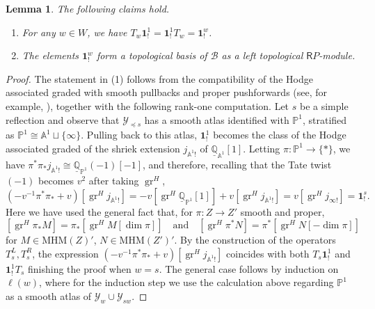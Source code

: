 \documentclass{amsart}
\newcommand{\Ring}{\mathsf{R}}
\newcommand{\bone}{\mathbf{1}}
\newcommand{\gr}{\operatorname{gr}}
\newcommand{\mhm}{\mathrm{MHM}}
\newcommand{\mc}[1]{\mathcal{#1}}
\newcommand{\mb}[1]{\mathbb{#1}}
\newtheorem{Lem}[Thm]{Lemma}
\theoremstyle{definition}
\numberwithin{equation}{section}
\begin{document}
\begin{Lem}\label{Lem:bone_properties}
The following claims hold.
\begin{enumerate}
\item For any $w \in W$, we have $T_w\bone_!^1=\bone_!^1 T_w=\bone_!^w$.
\item The elements $\bone_!^w$ form a topological basis of $\mathcal{B}$ as a left topological $\Ring P$-module.
\end{enumerate}
\end{Lem}
\begin{proof}
The statement in (1) follows from the compatibility of the Hodge associated graded with smooth pullbacks and proper pushforwards (see, for example, \cite[\S 28,30]{SchnellMHM}), together with the following rank-one computation. Let $s$ be a simple reflection and observe that $\mathcal{Y}_{\preceq s}$ has a smooth atlas identified with $\mathbb{P}^1$, stratified as $\mathbb{P}^1 \cong \mathbb{A}^1 \sqcup \{\infty\}$. Pulling back to this atlas, $\bone_!^1$ becomes the class of the Hodge associated graded of the shriek extension $j_{\mathbb{A}^1!}$ of $\underline{\mb{Q}}_{\mb{A}^1}[1]$. Letting $\pi : \mathbb{P}^1 \to \{*\}$, we have $\pi^*\pi_*j_{\mathbb{A}^1!} \cong \underline{\mathbb{Q}}_{\mathbb{P}^1}(-1)[-1]$, and therefore, recalling that the Tate twist $(-1)$ becomes $v^2$ after taking $\gr^H$,
\[
(-v^{-1}\pi^*\pi_* + v)[\gr^H j_{\mathbb{A}^1!}]
= -v[\gr^H \underline{\mathbb{Q}}_{\mathbb{P}^1}[1]] + v[\gr^H j_{\mathbb{A}^1!}]
= v[\gr^H j_{\infty!}]
= \bone_!^s.
\]
Here we have used the general fact that, for $\pi : Z \to Z'$ smooth and proper,
\[ [\gr^H \pi_* M] = \pi_*[\gr^H M [\dim \pi]] \quad \text{and} \quad [\gr^H \pi^*N] = \pi^*[\gr^H N [-\dim \pi]] \]
for $M \in \mhm(Z)'$, $N \in \mhm(Z')'$. By the construction of the operators $T_s^L,T_s^R$, the expression $(-v^{-1}\pi^*\pi_* + v)[\gr^H j_{\mathbb{A}^1!}]$ coincides with both $T_s\bone^1_!$ and $\bone^1_! T_s$ finishing the proof when $w = s$. The general case follows by induction on $\ell(w)$, where for the induction step we use the calculation above regarding $\mb{P}^1$ as a smooth atlas of $\mc{Y}_w \cup \mc{Y}_{sw}$.


\end{proof}
\end{document}
